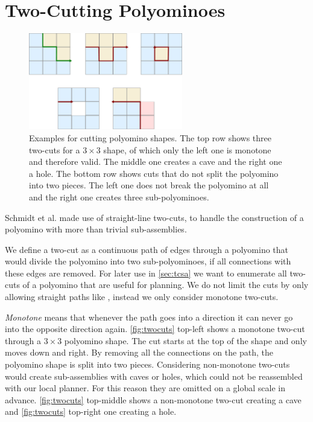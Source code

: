 \section{Two-Cutting Polyominoes}
\label{sec:twocutting}

\begin{figure}
	\centering
	\includegraphics[width=0.6\textwidth]{figures/twocuts.pdf}
	\caption[Different cuts for polyomino shapes]{Examples for cutting polyomino shapes. The top row shows three two-cuts for a $3\times3$ shape, of which only the left one is monotone and therefore valid. The middle one creates a cave and the right one a hole. The bottom row shows cuts that do not split the polyomino into two pieces. The left one does not break the polyomino at all and the right one creates three sub-polyominoes.}
	\label{fig:twocuts}
\end{figure}

Schmidt et al. \cite{Schmidt2018} made use of straight-line two-cuts, to handle the construction of a polyomino with more than trivial sub-assemblies.

We define a two-cut as a continuous path of edges through a polyomino that would divide the polyomino into two sub-polyominoes, if all connections with these edges are removed.
For later use in \autoref{sec:tcsa} we want to enumerate all two-cuts of a polyomino that are useful for planning.
We do not limit the cuts by only allowing straight paths like \cite{Schmidt2018}, instead we only consider monotone two-cuts.

\textit{Monotone} means that whenever the path goes into a direction it can never go into the opposite direction again.
\autoref{fig:twocuts} top-left shows a monotone two-cut through a $3\times3$ polyomino shape.
The cut starts at the top of the shape and only moves down and right.
By removing all the connections on the path, the polyomino shape is split into two pieces.
Considering non-monotone two-cuts would create sub-assemblies with caves or holes, which could not be reassembled with our local planner.
For this reason they are omitted on a global scale in advance.
\autoref{fig:twocuts} top-middle shows a non-monotone two-cut creating a cave and \autoref{fig:twocuts} top-right one creating a hole.

